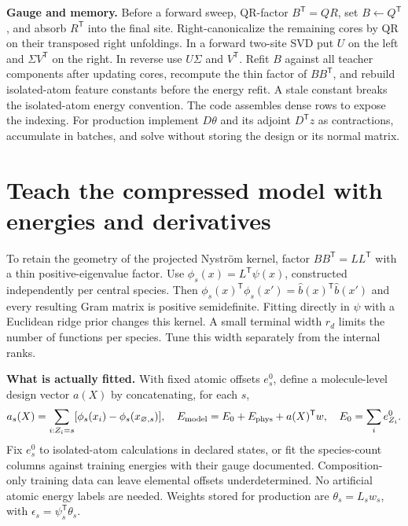 \documentclass[11pt,a4paper]{article}
\newcommand{\T}{\mathsf T}\newcommand{\tr}{\operatorname{tr}}
\newcommand{\phys}{\mathrm{phys}}\newcommand{\refm}{\mathrm{ref}}
\begin{document}
\textbf{Gauge and memory.} Before a forward sweep, QR-factor $B^\T=Q R$, set $B\gets Q^\T$, and absorb $R^\T$ into the final site. Right-canonicalize the remaining cores by QR on their transposed right unfoldings. In a forward two-site SVD put $U$ on the left and $\Sigma V^\T$ on the right. In reverse use $U\Sigma$ and $V^\T$. Refit $B$ against all teacher components after updating cores, recompute the thin factor of $BB^\T$, and rebuild isolated-atom feature constants before the energy refit. A stale constant breaks the isolated-atom energy convention. The code assembles dense rows to expose the indexing. For production implement $D\theta$ and its adjoint $D^\T z$ as contractions, accumulate in batches, and solve without storing the design or its normal matrix.
\pg\section{Teach the compressed model with energies and derivatives}\label{sec:fit}
To retain the geometry of the projected Nystr\"om kernel, factor $BB^\T=LL^\T$ with a thin positive-eigenvalue factor. Use $\phi_s(x)=L^\T\psi(x)$, constructed independently per central species. Then $\phi_s(x)^\T\phi_s(x')=\widehat b(x)^\T\widehat b(x')$ and every resulting Gram matrix is positive semidefinite. Fitting directly in $\psi$ with a Euclidean ridge prior changes this kernel. A small terminal width $r_d$ limits the number of functions per species. Tune this width separately from the internal ranks.

\textbf{What is actually fitted.} With fixed atomic offsets $e_s^0$, define a molecule-level design vector $a(X)$ by concatenating, for each $s$,
\begin{equation}
 a_s(X)=\sum_{i:Z_i=s}[\phi_s(x_i)-\phi_s(x_{\varnothing,s})],\quad
 E_{\rm model}=E_0+E_{\phys}+a(X)^\T w,\quad E_0=\sum_i e^0_{Z_i}.
\end{equation}
Fix $e_s^0$ to isolated-atom calculations in declared states, or fit the species-count columns against training energies with their gauge documented. Composition-only training data can leave elemental offsets underdetermined. No artificial atomic energy labels are needed. Weights stored for production are $\theta_s=L_s w_s$, with $\epsilon_s=\psi_s^\T\theta_s$.
\end{document}
